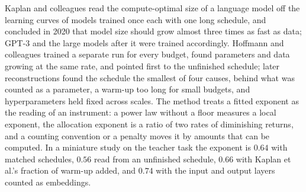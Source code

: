 \newcommand{\protocolopt}{\mathrm{opt}}
\begin{refsection}


\begin{chaptersummary}
Kaplan and colleagues read the compute-optimal size of a language model off the learning curves of models trained once each with one long schedule, and concluded in 2020 that model size should grow almost three times as fast as data; GPT-3 and the large models after it were trained accordingly. Hoffmann and colleagues trained a separate run for every budget, found parameters and data growing at the same rate, and pointed first to the unfinished schedule; later reconstructions found the schedule the smallest of four causes, behind what was counted as a parameter, a warm-up too long for small budgets, and hyperparameters held fixed across scales. The method treats a fitted exponent as the reading of an instrument: a power law without a floor measures a local exponent, the allocation exponent is a ratio of two rates of diminishing returns, and a counting convention or a penalty moves it by amounts that can be computed. In a miniature study on the teacher task the exponent is $0.64$ with matched schedules, $0.56$ read from an unfinished schedule, $0.66$ with Kaplan et al.'s fraction of warm-up added, and $0.74$ with the input and output layers counted as embeddings.
\end{chaptersummary}


\end{refsection}
